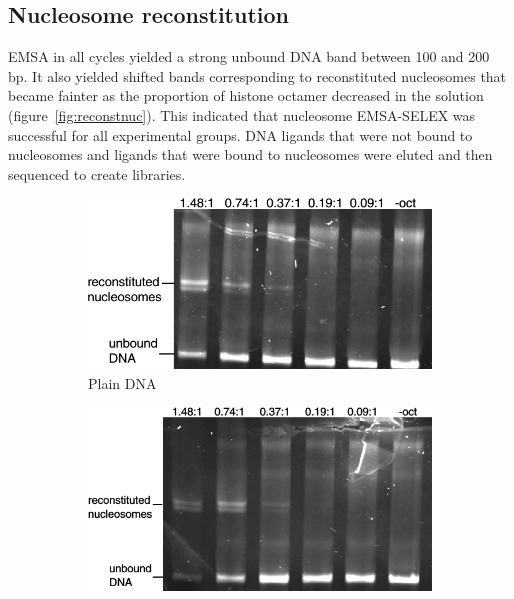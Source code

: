 \documentclass[parskip=full, numbers=noenddot]{scrbook}
\begin{document}
\subsection{Nucleosome reconstitution}
\label{ssec:reconstnuc}

EMSA in all cycles yielded a strong unbound DNA band between 100 and 200 bp. It also yielded shifted bands corresponding to reconstituted nucleosomes that became fainter as the proportion of histone octamer decreased in the solution (figure~\ref{fig:reconstnuc}).  This indicated that nucleosome EMSA-SELEX was successful for all experimental groups.  DNA ligands that were not bound to nucleosomes and ligands that were bound to nucleosomes were eluted and then sequenced to create libraries.

\begin{figure}[h]
  \centering
  \begin{subfigure}[htpb]{0.4\textwidth}
    \centering
    \includegraphics[width=\textwidth]{reconstnuc_a}
    \caption{Plain DNA}
    \label{fig:reconstnuc_a}
  \end{subfigure}
  \begin{subfigure}[htpb]{0.4\textwidth}
    \centering
    \includegraphics[width=\textwidth]{reconstnuc_b}

\end{subfigure}
\end{figure}
\end{document}
